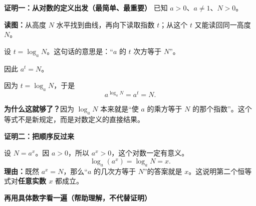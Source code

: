\begin{proofbox}
	\textbf{\textcolor{CProof}{证明一：从对数的定义出发（最简单、最重要）}}
	已知 $a>0$、$a\neq 1$、$N>0$。
\begin{center}

\end{center}
\textbf{读图：}从高度 $N$ 水平找到曲线，再向下读取指数 $t$；从这个 $t$ 又能读回同一高度 $N$。
	\begin{description}[style=nextline, leftmargin=2.8em, labelsep=0.5em, itemsep=0.4em]
		\item[\textbf{第一步：给未知的指数起个名字。}]
			设 $t=\log_a N$。这句话的意思是：“$a$ 的 $t$ 次方等于 $N$”。
		\item[\textbf{第二步：按定义写成乘方。}]
			因此 $a^t=N$。
		\item[\textbf{第三步：把 $t$ 换回原样。}]
			因为 $t=\log_a N$，于是
			\[
			\boxed{a^{\log_a N}=a^t=N}.
			\]
	\end{description}
	\textbf{为什么这就够了？}因为 $\log_a N$ 本来就是“使 $a$ 的乘方等于 $N$ 的那个指数”。这个等式不是新规定，而是对数定义的直接结果。

	\medskip
	\textbf{\textcolor{CProof}{证明二：把顺序反过来}}
\begin{center}

\end{center}
	设 $N=a^x$。因 $a>0$，所以 $a^x>0$，这个对数一定有意义。
	\[
	\log_a(a^x)=\log_a N=x.
	\]
	\textbf{理由：}既然 $a^x=N$，那么“$a$ 的几次方等于 $N$”的答案就是 $x$。这说明第二个恒等式对\textbf{任意实数 $x$} 都成立。

	\medskip
	\textbf{\textcolor{CProof}{再用具体数字看一遍（帮助理解，不代替证明）}}
	\begin{center}
	
	\end{center}
\end{proofbox}
